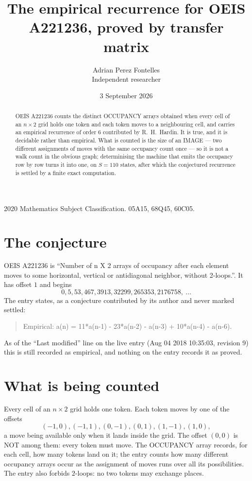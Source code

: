 \documentclass[11pt,a4paper]{article}
\title{The empirical recurrence for OEIS A221236, proved by transfer matrix}
\author{Adrian Perez Fontelles\\ \small Independent researcher}
\date{3 September 2026}
\theoremstyle{plain}
\theoremstyle{definition}
\begin{document}
\maketitle

\begin{abstract}
OEIS A221236 counts the distinct OCCUPANCY arrays obtained when every cell of an $n\times2$ grid
holds one token and each token moves to a neighbouring cell, and carries an empirical
recurrence of order $6$ contributed by R.~H.~Hardin. It is true, and it is decidable
rather than empirical. What is counted is the size of an IMAGE --- two different assignments of
moves with the same occupancy count once --- so it is not a walk count in the obvious graph;
determinising the machine that emits the occupancy row by row turns it into one, on $S=110$
states, after which the conjectured recurrence is settled by a finite exact computation.
\end{abstract}

\noindent\small 2020 Mathematics Subject Classification. 05A15, 68Q45, 60C05.\normalsize

\section{The conjecture}

OEIS A221236 is ``Number of n X 2 arrays of occupancy after each element moves to some horizontal, vertical or antidiagonal neighbor, without 2-loops.''. It has offset $1$ and begins
\[
0, 5, 53, 467, 3913, 32299, 265353, 2176758,\ \dots
\]
The entry states, as a conjecture contributed by its author and never marked settled:
\begin{quote}
Empirical: a(n) = 11*a(n-1) - 23*a(n-2) - a(n-3) + 10*a(n-4) - a(n-6).
\end{quote}
As of the ``Last modified'' line on the live entry (Aug 04 2018 10:35:03, revision 9) this is still
recorded as empirical, and nothing on the entry records it as proved.

\section{What is being counted}

Every cell of an $n\times2$ grid holds one token. Each token moves by one of the offsets
\[
(-1,0), (-1,1), (0,-1), (0,1), (1,-1), (1,0),
\]
a move being available only when it lands inside the grid. The offset $(0,0)$ is NOT among them: every token must move. The OCCUPANCY array
records, for each cell, how many tokens land on it; the entry counts how many different
occupancy arrays occur as the assignment of moves runs over all its possibilities. The entry also forbids $2$-loops: no two tokens may exchange places.
\end{document}
